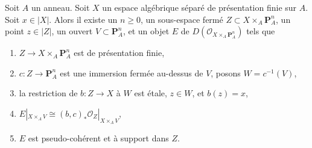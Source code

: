 \begin{lemma}
\label{lemma-derived-chow}
Soit $A$ un anneau. Soit $X$ un espace algébrique séparé
de présentation finie sur $A$. Soit $x \in |X|$. Alors il existe
un $n \geq 0$,
un sous-espace fermé $Z \subset X \times_A \mathbf{P}^n_A$,
un point $z \in |Z|$,
un ouvert $V \subset \mathbf{P}^n_A$, et
un objet $E$ de $D(\mathcal{O}_{X \times_A \mathbf{P}^n_A})$ tels que
\begin{enumerate}
\item $Z \to X \times_A \mathbf{P}^n_A$ est de présentation finie,
\item $c : Z \to \mathbf{P}^n_A$ est une immersion fermée au-dessus de $V$,
posons $W = c^{-1}(V)$,
\item la restriction de $b : Z \to X$ à $W$ est \'etale,
$z \in W$, et $b(z) = x$,
\item $E|_{X \times_A V} \cong
(b, c)_*\mathcal{O}_Z|_{X \times_A V}$,
\item $E$ est pseudo-cohérent et à support dans $Z$.
\end{enumerate}
\end{lemma}

